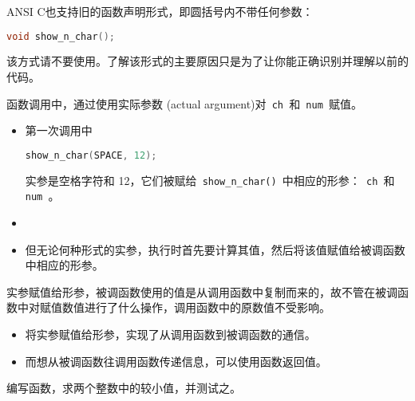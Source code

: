 \begin{frame}[fragile]
ANSI C也支持旧的函数声明形式，即圆括号内不带任何参数：
\begin{lstlisting}[language=c,backgroundcolor=\color{red!10}]
void show_n_char();
\end{lstlisting}
该方式请不要使用。了解该形式的主要原因只是为了让你能正确识别并理解以前的代码。
\end{frame}

\begin{frame}[fragile]
函数调用中，通过使用实际参数{ (actual argument)}对\lstinline| ch |和\lstinline| num |赋值。
\begin{itemize}
\item
第一次调用中
\begin{lstlisting}[language=c,backgroundcolor=\color{red!10}]
show_n_char(SPACE, 12);
\end{lstlisting}
实参是空格字符和{ 12}，它们被赋给\lstinline| show_n_char() |中相应的形参：\lstinline| ch |和\lstinline| num |。\\[0.1in]
\item {}\\[0.1in]
\item 但无论何种形式的实参，执行时首先要计算其值，然后将该值赋值给被调函数中相应的形参。
\end{itemize}
\end{frame}

\begin{frame}[fragile]
实参赋值给形参，被调函数使用的值是从调用函数中复制而来的，故不管在被调函数中对赋值数值进行了什么操作，调用函数中的原数值不受影响。
\end{frame}

\begin{frame}[fragile]
\begin{itemize}
\item
将实参赋值给形参，实现了从调用函数到被调函数的通信。\\[0.1in]
\item
而想从被调函数往调用函数传递信息，可以使用函数返回值。
\end{itemize}

\end{frame}

\begin{frame}[fragile]
  \begin{wenti}
    编写函数，求两个整数中的较小值，并测试之。
  \end{wenti}
\end{frame}

